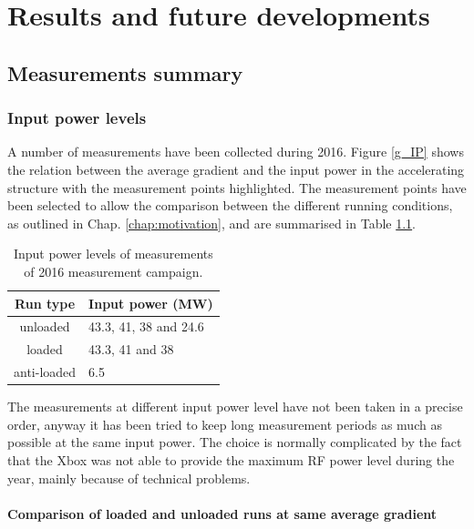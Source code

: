 \chapter[Results and future developments]{Results and future developments}
\label{chap:results}

\section[Measurements summary]{Measurements summary}

\subsection[Input power levels]{Input power levels}

A number of measurements have been collected during 2016. Figure \ref{g_IP} shows the relation between the average gradient and the input power in the accelerating structure with the measurement points highlighted. The measurement points have been selected to allow the comparison between the different running conditions, as outlined in Chap. \ref{chap:motivation}, and are summarised in Table \ref{run_pwr}.

\begin{table}
  \centering
    \begin{tabular}{ c l }
    \hline
    \hline
    Run type		&	Input power (MW)		\\
    \hline
    unloaded 		&	43.3, 41, 38 and 24.6	\\
    loaded			&	43.3, 41 and 38			\\
    anti-loaded		&	6.5					\\
    \hline
    \hline
    \end{tabular}
\caption{Input power levels of measurements of 2016 measurement campaign.}
\label{run_pwr}
\end{table}

The measurements at different input power level have not been taken in a precise order, anyway it has been tried to keep long measurement periods as much as possible at the same input power. 
The choice is normally complicated by the fact that the Xbox was not able to provide the maximum RF power level during the year, mainly because of technical problems.


\subsubsection{Comparison of loaded and unloaded runs at same average gradient}

